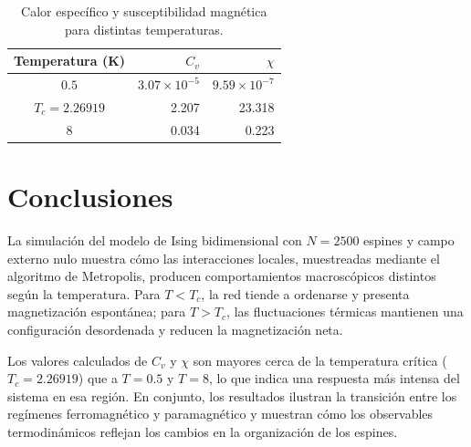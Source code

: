 \documentclass[11pt, a4paper]{article}
\begin{document}
\begin{table}[H]
    \centering
    \begin{tabular}{|c|r|r|}
        \hline
        \textbf{Temperatura (K)} & \textbf{$C_v$} & \textbf{$\chi$} \\
        \hline
        $0.5$ & $3.07 \times 10^{-5}$ & $9.59 \times 10^{-7}$ \\
        $T_c = 2.26919$ & 2.207 & 23.318 \\
        $8$ & 0.034 & 0.223 \\
        \hline
    \end{tabular}
    \caption{Calor específico y susceptibilidad magnética para distintas temperaturas.}
    \label{tab:observables-temperatura}
\end{table}

\section{Conclusiones}

La simulación del modelo de Ising bidimensional con $N=2500$ espines y campo externo nulo muestra cómo las interacciones locales, muestreadas mediante el algoritmo de Metropolis, producen comportamientos macroscópicos distintos según la temperatura. Para $T<T_c$, la red tiende a ordenarse y presenta magnetización espontánea; para $T>T_c$, las fluctuaciones térmicas mantienen una configuración desordenada y reducen la magnetización neta.

Los valores calculados de $C_v$ y $\chi$ son mayores cerca de la temperatura crítica ($T_c=2.26919$) que a $T=0.5$ y $T=8$, lo que indica una respuesta más intensa del sistema en esa región. En conjunto, los resultados ilustran la transición entre los regímenes ferromagnético y paramagnético y muestran cómo los observables termodinámicos reflejan los cambios en la organización de los espines.


\renewcommand{\refname}{Referencias}
\nocite{marenduzzo_mvp}


\end{document}
